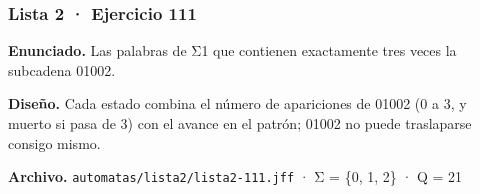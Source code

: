 
\hypertarget{lista-2-ejercicio-111}{%
\subsubsection{Lista 2 · Ejercicio 111}\label{lista-2-ejercicio-111}}

\textbf{Enunciado.} Las palabras de Σ1 que contienen exactamente tres veces la subcadena 01002.

\textbf{Diseño.} Cada estado combina el número de apariciones de 01002 (0 a 3, y muerto si pasa de 3) con el avance en el patrón; 01002 no puede traslaparse consigo mismo.

\textbf{Archivo.} \texttt{automatas/lista2/lista2-111.jff} · Σ = \{0, 1, 2\} · \textbar Q\textbar{} = 21

